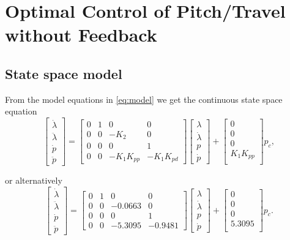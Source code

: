 \section{Optimal Control of Pitch/Travel without Feedback}\label{sec:prob2}
\label{text:problem2}

\subsection{State space model}
\label{text:problem2_state_space}
From the model equations in \eqref{eq:model} we get the continuous state space equation
\begin{equation*}
	\begin{bmatrix}
		\dot{\lambda}\\
		\ddot{\lambda}\\
		\dot{p}\\
		\ddot{p}
	\end{bmatrix} = 
	\begin{bmatrix}
		0 & 1 & 0 & 0 \\
		0 & 0 & -K_2 & 0 \\
		0 & 0 & 0 & 1 \\
		0 & 0 & -K_1K_{pp} & -K_1K_{pd}
	\end{bmatrix}
	\begin{bmatrix}
		\lambda	\\
		\dot{\lambda}		\\
		p		\\
		\dot{p}
	\end{bmatrix} +
	\begin{bmatrix}
		0 \\
		0 \\
		0 \\
		K_1K_{pp} \\
	\end{bmatrix}
	p_c,
\end{equation*}

or alternatively
\begin{equation*}
	\begin{bmatrix}
		\dot{\lambda}\\
		\ddot{\lambda}\\
		\dot{p}\\
		\ddot{p}
	\end{bmatrix} = 
	\begin{bmatrix}
		0 & 1 & 0 & 0 \\
		0 & 0 & -0.0663 & 0 \\
		0 & 0 & 0 & 1 \\
		0 & 0 & -5.3095 & -0.9481
	\end{bmatrix}
	\begin{bmatrix}
		\lambda	\\
		\dot{\lambda}		\\
		p		\\
		\dot{p}
	\end{bmatrix} +
	\begin{bmatrix}
		0 \\
		0 \\
		0 \\
		5.3095 \\
	\end{bmatrix}
	p_c.
\end{equation*}

